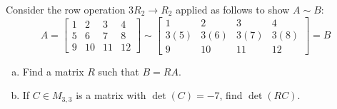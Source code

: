 \begin{activity}{5}
Consider the row operation \(3R_2\to R_2\) applied as follows to show
\(A\sim B\):
\[
A=\begin{bmatrix}1&2&3&4\\5&6&7&8\\9&10&11&12\end{bmatrix}
  \sim
\begin{bmatrix}1&2&3&4\\3(5)&3(6)&3(7)&3(8)\\9&10&11&12\end{bmatrix}=B
\]
\begin{enumerate}[(a)]
\item Find a matrix \(R\) such that \(B=RA\).
\item If \(C \in M_{3,3}\) is a matrix with \(\det(C)= -7\), find \(\det(RC)\).
\end{enumerate}
\end{activity}


